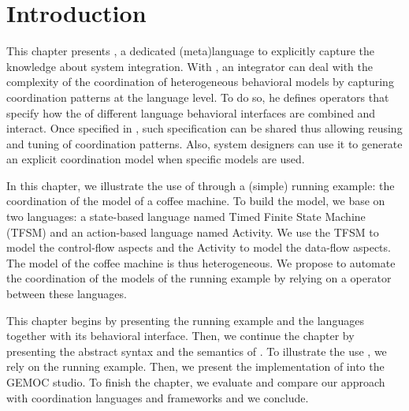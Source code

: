 \section{Introduction}
\label{sec:bcoolintro}
This chapter presents \bcool, a dedicated (meta)language to explicitly capture the knowledge about system integration. With \bcool, an integrator can deal with the complexity of the coordination of heterogeneous behavioral models by capturing coordination patterns at the language level. To do so, he defines operators that specify how the \dse of different language behavioral interfaces are combined and interact. Once specified in \bcool, such specification can be shared thus allowing reusing and tuning of coordination patterns. Also, system designers can use it to generate an explicit coordination model when specific models are used.    
	
In this chapter, we illustrate the use of \bcool through a (simple) running example: the coordination of the model of a coffee machine. To build the model, we base on two languages: a state-based language named Timed Finite State Machine (TFSM) and an action-based language named Activity. We use the TFSM to model the control-flow aspects and the Activity to model the data-flow aspects. The model of the coffee machine is thus heterogeneous. We propose to automate the coordination of the models of the running example by relying on a \bcool operator between these languages.


This chapter begins by presenting the running example and the languages together with its behavioral interface.  Then, we continue the chapter by presenting the abstract syntax and the semantics of \bcool. To illustrate the use \bcool, we rely on the running example. Then, we present the implementation of \bcool into the GEMOC studio. To finish the chapter, we evaluate and compare our approach with coordination languages and frameworks and we conclude.



